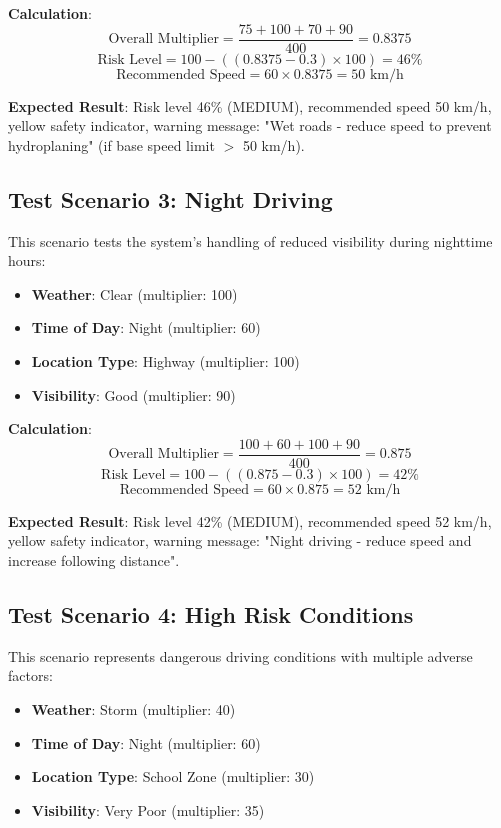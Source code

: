 \textbf{Calculation}:
\begin{equation}
\text{Overall Multiplier} = \frac{75 + 100 + 70 + 90}{400} = 0.8375
\end{equation}
\begin{equation}
\text{Risk Level} = 100 - ((0.8375 - 0.3) \times 100) = 46\%
\end{equation}
\begin{equation}
\text{Recommended Speed} = 60 \times 0.8375 = 50 \text{ km/h}
\end{equation}

\textbf{Expected Result}: Risk level 46\% (MEDIUM), recommended speed 50 km/h, yellow safety indicator, warning message: "Wet roads - reduce speed to prevent hydroplaning" (if base speed limit $>$ 50 km/h).

\subsection{Test Scenario 3: Night Driving}
This scenario tests the system's handling of reduced visibility during nighttime hours:
\begin{itemize}
    \item \textbf{Weather}: Clear (multiplier: 100)
    \item \textbf{Time of Day}: Night (multiplier: 60)
    \item \textbf{Location Type}: Highway (multiplier: 100)
    \item \textbf{Visibility}: Good (multiplier: 90)
\end{itemize}

\textbf{Calculation}:
\begin{equation}
\text{Overall Multiplier} = \frac{100 + 60 + 100 + 90}{400} = 0.875
\end{equation}
\begin{equation}
\text{Risk Level} = 100 - ((0.875 - 0.3) \times 100) = 42\%
\end{equation}
\begin{equation}
\text{Recommended Speed} = 60 \times 0.875 = 52 \text{ km/h}
\end{equation}

\textbf{Expected Result}: Risk level 42\% (MEDIUM), recommended speed 52 km/h, yellow safety indicator, warning message: "Night driving - reduce speed and increase following distance".

\subsection{Test Scenario 4: High Risk Conditions}
This scenario represents dangerous driving conditions with multiple adverse factors:
\begin{itemize}
    \item \textbf{Weather}: Storm (multiplier: 40)
    \item \textbf{Time of Day}: Night (multiplier: 60)
    \item \textbf{Location Type}: School Zone (multiplier: 30)
    \item \textbf{Visibility}: Very Poor (multiplier: 35)
\end{itemize}


